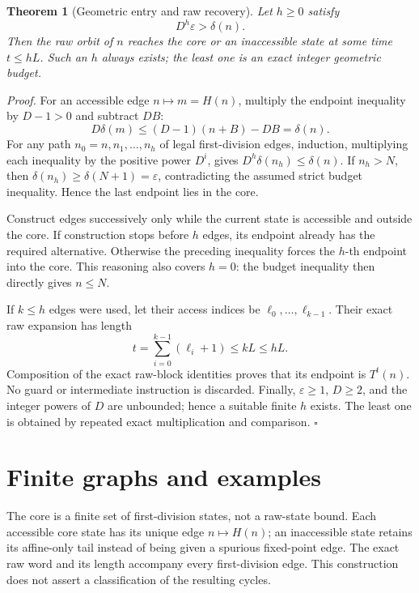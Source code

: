 \documentclass[11pt,letterpaper]{article}
\newtheorem{theorem}{Theorem}
\newenvironment{proof}{\noindent\textit{Proof.}}{\hfill\(\square\)}
\begin{document}
\begin{theorem}[Geometric entry and raw recovery]
Let \(h\geq0\) satisfy
\[
 D^h\varepsilon>\delta(n).
\]
Then the raw orbit of \(n\) reaches the core or an inaccessible state at some
time \(t\leq hL\). Such an \(h\) always exists; the least one is an exact
integer geometric budget.
\end{theorem}

\begin{proof}
For an accessible edge \(n\mapsto m=H(n)\), multiply the endpoint inequality
by \(D-1>0\) and subtract \(DB\):
\[
 D\delta(m)\leq(D-1)(n+B)-DB=\delta(n).
\]
For any path \(n_0=n,n_1,\ldots,n_h\) of legal first-division edges,
induction, multiplying each inequality by the positive power \(D^i\), gives
\(D^h\delta(n_h)\leq\delta(n)\). If \(n_h>N\), then
\(\delta(n_h)\geq\delta(N+1)=\varepsilon\), contradicting the assumed
strict budget inequality. Hence the last endpoint lies in the core.

Construct edges successively only while the current state is accessible and
outside the core. If construction stops before \(h\) edges, its endpoint
already has the required alternative. Otherwise the preceding inequality
forces the \(h\)-th endpoint into the core. This reasoning also covers
\(h=0\): the budget inequality then directly gives \(n\leq N\).

If \(k\leq h\) edges were used, let their access indices be
\(\ell_0,\ldots,\ell_{k-1}\). Their exact raw expansion has length
\[
 t=\sum_{i=0}^{k-1}(\ell_i+1)\leq kL\leq hL.
\]
Composition of the exact raw-block identities proves that its endpoint is
\(T^t(n)\). No guard or intermediate instruction is discarded.
Finally, \(\varepsilon\geq1\), \(D\geq2\), and the integer powers of
\(D\) are unbounded; hence a suitable finite \(h\) exists. The least one
is obtained by repeated exact multiplication and comparison.
\end{proof}

\section{Finite graphs and examples}

The core is a finite set of first-division states, not a raw-state bound.
Each accessible core state has its unique edge \(n\mapsto H(n)\); an
inaccessible state retains its affine-only tail instead of being given a
spurious fixed-point edge. The exact raw word and its length accompany
every first-division edge. This construction does not assert a classification
of the resulting cycles.
\end{document}
